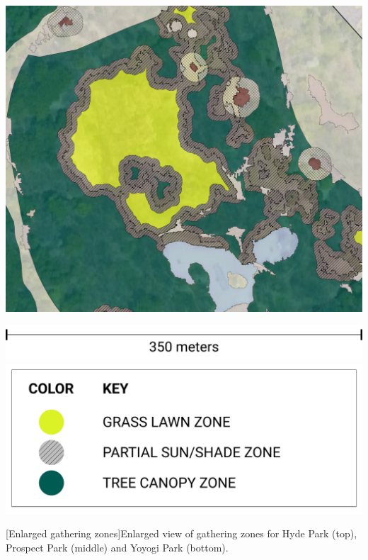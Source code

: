 \begin{multicols}{2}
\begin{minipage}{0.45\textwidth}
    \includegraphics[width=\linewidth]{images/gatherings/yoyogi_locations_1000}\par\hspace{3pt}
    \includegraphics[width=\linewidth]{images/gatherings/scale_legend_4.png}
    \includegraphics[width=\linewidth]{images/gatherings/gatherings_legend_2.png}
    \par{}[Enlarged gathering zones]{Enlarged view of gathering zones for Hyde Park (top), Prospect Park (middle) and Yoyogi Park (bottom).}
    \label{fig:locations_1000}
\end{minipage}


\end{multicols}
